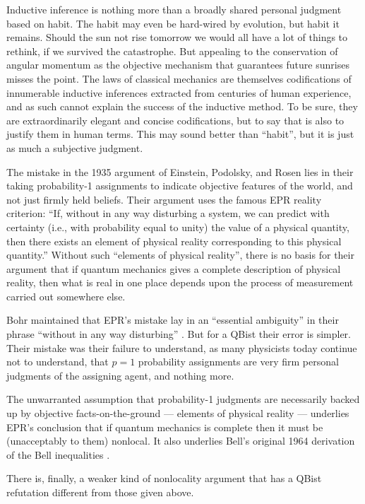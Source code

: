 \documentclass[aps,prb,superscriptaddress,12pt,tightenlines,nofootinbib]{revtex4-2}
\begin{document}
Inductive inference is nothing more than a broadly shared personal judgment based on habit.  The habit may even be hard-wired by evolution,  but habit it remains.    Should the sun not rise tomorrow we would all have a lot of things to rethink, if we survived the catastrophe.   But appealing to the conservation of angular momentum as the objective mechanism that guarantees future sunrises misses the point.   The laws of classical mechanics are themselves codifications of
innumerable inductive inferences extracted from centuries of human experience, and as such cannot explain the success of the inductive method.  To be sure, they are extraordinarily elegant and concise codifications, but to say that is also to justify them in human terms.    This may sound better than ``habit'', but it is just as much a subjective judgment.

The mistake in the 1935 argument of Einstein, Podolsky, and Rosen lies in their taking probability-1 assignments to indicate objective features of the world, and not just
firmly held beliefs.  Their argument uses the famous EPR reality criterion:  ``If, without in any way disturbing a system, we can predict with certainty (i.e., with probability equal to unity) the value of a physical quantity, then there exists an element of physical reality corresponding to this physical quantity.''   Without such ``elements of physical reality'',  there is no basis for their argument that if quantum mechanics gives a complete description of physical reality, then what is real in one place depends upon the process of measurement carried out somewhere else.

Bohr maintained that EPR's mistake lay in an ``essential ambiguity'' in their phrase ``without in any way disturbing'' \cite{Bohr35}.   But for a QBist their error is simpler.   Their mistake was their failure to understand, as many physicists today continue not to understand, that $p=1$ probability assignments are very firm personal judgments of the assigning agent, and nothing more.

The unwarranted assumption that probability-1 judgments are necessarily backed up by objective facts-on-the-ground --- elements of physical reality --- underlies EPR's conclusion that if quantum mechanics is complete then it must be (unacceptably to them) nonlocal.    It also underlies Bell's original 1964 derivation of the Bell inequalities \cite{Bell64}.

\vskip 10pt

There is, finally, a weaker kind of nonlocality argument that has a QBist  refutation different from those given above.
\end{document}
